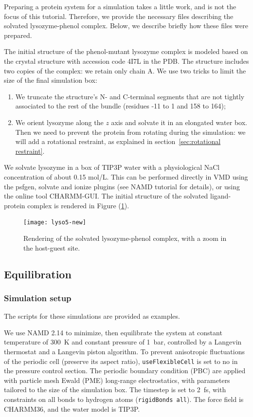 \documentclass[9pt,tutorial]{livecoms}
\begin{document}
Preparing a protein system for a simulation takes a little work, and is not the focus of this tutorial.
Therefore, we provide the necessary files describing the solvated lysozyme-phenol complex. 
Below, we describe briefly how these files were prepared.

The initial structure of the phenol-mutant lysozyme complex is modeled based on the crystal structure with accession code 4I7L in the PDB.
The structure includes two copies of the complex: we retain only chain A.
We use two tricks to limit the size of the final simulation box:
\begin{enumerate}
    \item We truncate the structure's N- and C-terminal segments that are not tightly associated to the rest of the bundle (residues -11 to 1 and 158 to 164);
    \item We orient lysozyme along the $z$ axis and solvate it in an elongated water box.
Then we need to prevent the protein from rotating during the simulation: we will add a rotational restraint, as explained in section~\ref{sec:rotational restraint}.
\end{enumerate}

We solvate lysozyme in a box of TIP3P water with a physiological NaCl concentration of about 0.15 mol/L.
This can be performed directly in VMD using the psfgen, solvate and ionize plugins (see NAMD tutorial for details\cite{phillips2003}), or using the online tool CHARMM-GUI\cite{Jo2008, Lee2016}.
The initial structure of the solvated ligand-protein complex is rendered in Figure (\ref{fig:assembly}).

\begin{figure}[!ht]
\centering
\texttt{[image: lyso5-new]}
\caption{Rendering of the solvated lysozyme-phenol complex, with a zoom in the host-guest site. 
}
\label{fig:assembly}
\end{figure}


\subsection{Equilibration}\label{sec:8.2}
\label{sec:equilibration}

\subsubsection{Simulation setup}

The scripts for these simulations are provided as examples.

We use NAMD 2.14\cite{Phillips2020} to minimize, then equilibrate the system at constant temperature of 300~K and constant pressure of 1~bar, controlled by a Langevin thermostat and a Langevin piston algorithm\cite{Phillips2005}.
To prevent anisotropic fluctuations of the periodic cell (preserve its aspect ratio), \texttt{useFlexibleCell} is set to no in the pressure control section.
The periodic boundary condition (PBC) are applied with particle mesh Ewald (PME) long-range electrostatics\cite{Darden1993}, with parameters tailored to the size of the simulation box.
The timestep is set to 2~fs, with constraints on all bonds to hydrogen atoms (\texttt{rigidBonds all}).
The force field is CHARMM36\cite{Best2012}, and the water model is TIP3P\cite{Jorgensen1983}.
\end{document}

